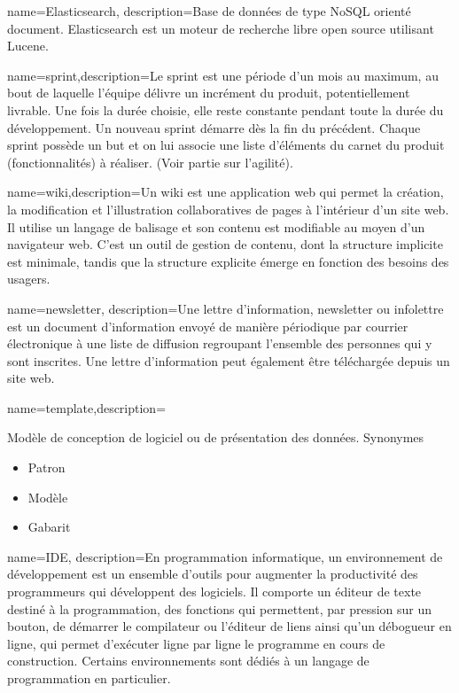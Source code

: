 {name={Elasticsearch}, description={Base de données de type NoSQL orienté document. Elasticsearch est un moteur de recherche libre open source utilisant Lucene.}}

{name={sprint},description={Le sprint est une période d'un mois au maximum, au bout de laquelle l'équipe délivre un incrément du produit, potentiellement livrable. Une fois la durée choisie, elle reste constante pendant toute la durée du développement. Un nouveau sprint démarre dès la fin du précédent. Chaque sprint possède un but et on lui associe une liste d'éléments du carnet du produit (fonctionnalités) à réaliser. (Voir partie sur l'agilité).}}

{name={wiki},description={Un wiki est une application web qui permet la création, la modification et l'illustration collaboratives de pages à l'intérieur d'un site web. Il utilise un langage de balisage et son contenu est modifiable au moyen d’un navigateur web. C'est un outil de gestion de contenu, dont la structure implicite est minimale, tandis que la structure explicite émerge en fonction des besoins des usagers.}}

{name={newsletter}, description={Une lettre d'information, newsletter ou infolettre est un document d'information envoyé de manière périodique par courrier électronique à une liste de diffusion regroupant l'ensemble des personnes qui y sont inscrites. Une lettre d'information peut également être téléchargée depuis un site web.}}

{name={template},description={
        Modèle de conception de logiciel ou de présentation des données.
        Synonymes 
        \begin{itemize}
        \item Patron
        \item Modèle
        \item Gabarit
        \end{itemize}}
        }

{name={IDE}, description={En programmation informatique, un environnement de développement est un ensemble d'outils pour augmenter la productivité des programmeurs qui développent des logiciels. Il comporte un éditeur de texte destiné à la programmation, des fonctions qui permettent, par pression sur un bouton, de démarrer le compilateur ou l'éditeur de liens ainsi qu'un débogueur en ligne, qui permet d'exécuter ligne par ligne le programme en cours de construction. Certains environnements sont dédiés à un langage de programmation en particulier.}}

